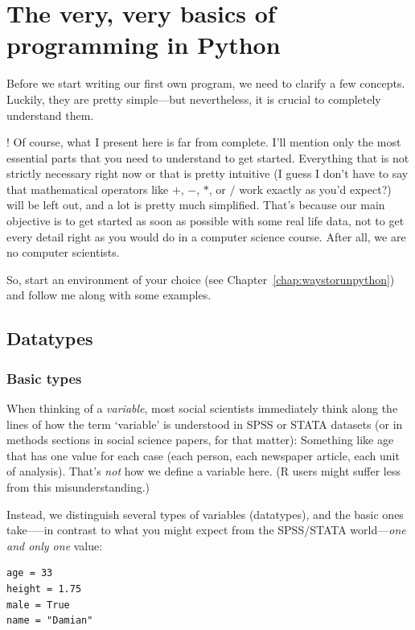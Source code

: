\documentclass[a4paper,12pt]{book}
\renewcommand{\texttt}[1]{%
  \begingroup
  \ttfamily
  \begingroup\lccode`~=`/\lowercase{\endgroup\def~}{/\discretionary{}{}{}}%
  \begingroup\lccode`~=`[\lowercase{\endgroup\def~}{[\discretionary{}{}{}}%
  \begingroup\lccode`~=`.\lowercase{\endgroup\def~}{.\discretionary{}{}{}}%
  \begingroup\lccode`~=`(\lowercase{\endgroup\def~}{(\discretionary{}{}{}}%
  \catcode`/=\active\catcode`[=\active\catcode`.=\active\catcode`(=\active
  \scantokens{#1\noexpand}%
  \endgroup
}
\let\oldquote\quote
\let\endoldquote\endquote
\renewenvironment{quote}{
\oldquote\footnotesize
\lettrine[lines=3]{\color{BrickRed}!}{ }}
{\endoldquote}
\begin{document}
 
 
 
\chapter{The very, very basics of programming in Python}
\label{chap:basics}
Before we start writing our first own program, we need to clarify a few concepts. Luckily, they are pretty simple---but nevertheless, it is crucial to completely understand them. 

\begin{quote}
Of course, what I present here is far from complete. I'll mention only the most essential parts that you need to understand to get started. Everything that is not strictly necessary right now or that is pretty intuitive (I guess I don't have to say that mathematical operators like $+$, $-$, $*$, or $/$ work exactly as you'd expect?) will be left out, and a lot is pretty much simplified. That's because our main objective is to get started as soon as possible with some real life data, not to get every detail right as you would do in a computer science course. After all, we are no computer scientists.  
\end{quote}

So, start an environment of your choice (see Chapter~\ref{chap:waystorunpython}) and follow me along with some examples.


\section{Datatypes}
\label{datatypes}
\subsection{Basic types}
When thinking of a \emph{variable}, most social scientists immediately think along the lines of how the term `variable' is understood in SPSS or STATA datasets (or in methods sections in social science papers, for that matter): Something like age that has one value for each case (each person, each newspaper article, each unit of analysis). That's \emph{not} how we define a variable here. (R users might suffer less from this misunderstanding.)

Instead, we distinguish several types of variables (datatypes), and the basic ones take–––in contrast to what you might expect from the SPSS/STATA world---\emph{one and only one} value:

\begin{lstlisting}
age = 33
height = 1.75
male = True
name = "Damian"
\end{lstlisting}
\end{document}
